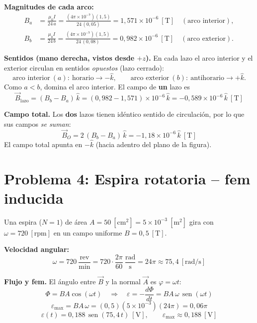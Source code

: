\documentclass[12pt,letterpaper]{article}
\begin{document}
\medskip

\noindent\textbf{Magnitudes de cada arco:}
\begin{align*}
    B_a &= \frac{\mu_0 I}{24\,a} = \frac{(4\pi\times10^{-7})(1{,}5)}{24\,(0{,}05)} = 1{,}571\times10^{-6}\ [\text{T}]\quad(\text{arco interior}),\\[2pt]
    B_b &= \frac{\mu_0 I}{24\,b} = \frac{(4\pi\times10^{-7})(1{,}5)}{24\,(0{,}08)} = 0{,}982\times10^{-6}\ [\text{T}]\quad(\text{arco exterior}).
\end{align*}

\noindent\textbf{Sentidos (mano derecha, vistos desde $+z$).} En cada lazo el arco interior y el
exterior circulan en sentidos \emph{opuestos} (lazo cerrado):
\[
    \text{arco interior}\ (a):\ \text{horario} \to -\hat{k},
    \qquad
    \text{arco exterior}\ (b):\ \text{antihorario} \to +\hat{k}.
\]
Como $a<b$, domina el arco interior. El campo de \textbf{un} lazo es
\[
    \vec{B}_{\text{lazo}} = (B_b - B_a)\,\hat{k} = (0{,}982 - 1{,}571)\times10^{-6}\,\hat{k}
    = -0{,}589\times10^{-6}\,\hat{k}\ [\text{T}]
\]

\noindent\textbf{Campo total.} Los \textbf{dos} lazos tienen id\'entico sentido de circulaci\'on,
por lo que sus campos \emph{se suman}:
\[
    \boxed{\vec{B}_O = 2\,(B_b - B_a)\,\hat{k} = -1{,}18\times10^{-6}\,\hat{k}\ [\text{T}]}
\]
\noindent\small El campo total apunta en $-\hat{k}$ (hacia adentro del plano de la figura).\normalsize

\vspace{0.5cm}

\section*{Problema 4: Espira rotatoria -- fem inducida}

\noindent Una espira ($N=1$) de \'area $A = 50\ [\text{cm}^2] = 5\times10^{-3}\ [\text{m}^2]$ gira
con $\omega = 720\ [\text{rpm}]$ en un campo uniforme $B = 0{,}5\ [\text{T}]$.

\medskip

\noindent\textbf{Velocidad angular:}
\[
    \omega = 720\ \frac{\text{rev}}{\text{min}} = 720\cdot\frac{2\pi}{60}\ \frac{\text{rad}}{\text{s}}
           = 24\pi \approx 75{,}4\ [\text{rad/s}]
\]

\noindent\textbf{Flujo y fem.} El \'angulo entre $\vec{B}$ y la normal $\vec{A}$ es $\varphi=\omega t$:
\[
    \Phi = BA\cos(\omega t)
    \quad\Longrightarrow\quad
    \varepsilon = -\frac{d\Phi}{dt} = BA\,\omega\,\operatorname{sen}(\omega t)
\]
\[
    \varepsilon_{\max} = BA\,\omega = (0{,}5)(5\times10^{-3})(24\pi) = 0{,}06\pi
\]
\[
    \boxed{\varepsilon(t) = 0{,}188\,\operatorname{sen}(75{,}4\,t)\ [\text{V}],
    \qquad \varepsilon_{\max} \approx 0{,}188\ [\text{V}]}
\]
\end{document}
